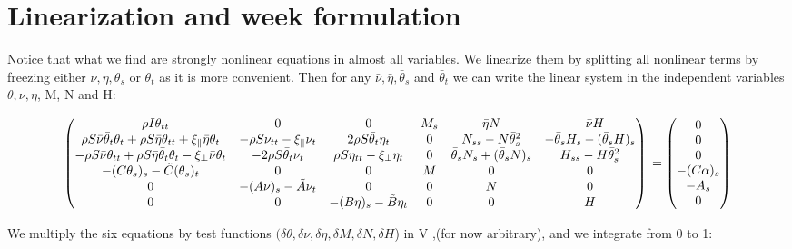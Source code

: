 
\usepackage{pdfsync}
\usepackage{amsmath}
\usepackage{graphicx}

\section{Linearization and week formulation}

Notice that what we find are strongly nonlinear equations in almost all variables.
We linearize them by splitting all nonlinear terms by freezing either $\nu, \eta, \theta_s$ or $\theta_t$ as it is more convenient. Then for any $\bar{\nu}, \bar{\eta}, \bar{\theta}_s$ and $\bar{\theta}_t$ we can write the linear system in the independent variables $\theta, \nu, \eta$, M, N and H:

\[\begin{pmatrix}
-\rho I \theta_{tt} & 0 & 0 & M_s & \bar{\eta}N & -\bar{\nu}H \\
\rho S\bar{\nu}\bar{\theta}_t\theta_t + \rho S \bar{\eta}\theta_{tt} + \xi_{\parallel}\bar{\eta}\theta_t & -\rho S \nu_{tt} -\xi_{\parallel}\nu_t & 2 \rho S\bar{\theta}_t\eta_t & 0 & N_{ss} - N\bar{\theta}_s^2 & -\bar{\theta}_s H_s - (\bar{\theta}_s H)_s \\
-\rho S \bar{\nu}\theta_{tt} + \rho S \bar{\eta}\bar{\theta}_t\theta_t - \xi_{\perp}\bar{\nu}\theta_t & - 2\rho S \bar{\theta}_t \nu_t & \rho S \eta_{tt} - \xi_{\perp}\eta_t & 0 & \bar{\theta}_s N_s + (\bar{\theta}_s N)_s & H_{ss}-H\bar{\theta}_s^2 \\
-(C\theta_s)_s -\tilde{C}(\theta_s)_t& 0 & 0 & M & 0 & 0 \\
0 & -(A\nu)_s -\tilde{A}\nu_t & 0 & 0 & N & 0 \\
0 & 0 & -(B\eta)_s - \tilde{B}\eta_t & 0 & 0 & H 
\end{pmatrix}
\\ =
\begin{pmatrix}
0\\
0\\
0\\
-(C\alpha)_s\\
-A_s\\
0
\end{pmatrix}\]

We multiply the six equations by test functions
$(\delta \theta, \delta\nu, \delta \eta, \delta M,\delta N, \delta H$) in V ,(for now arbitrary), and we integrate from 0 to 1: 

